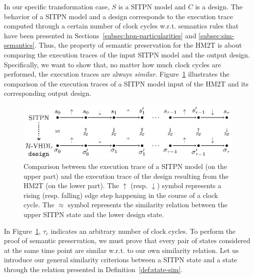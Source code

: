 \documentclass[pdflatex,sn-mathphys]{sn-jnl}%
\theoremstyle{thmstyleone}%
\theoremstyle{thmstyletwo}%
\theoremstyle{thmstylethree}%
\begin{document}
In our specific transformation case, $S$ is a SITPN model and $C$ is a
\hvhdl{} design. The behavior of a SITPN model and a \hvhdl{} design
corresponds to the execution trace computed through a certain number
of clock cycles w.r.t. semantics rules that have been presented in
Sections~\ref{subsec:hpn-particularities} and
\ref{subsec:sim-semantics}. Thus, the property of semantic
preservation for the HM2T is about comparing the execution traces of
the input SITPN model and the output \hvhdl{} design. Specifically, we
want to show that, no matter how much clock cycles are performed, the
execution traces are always
\textit{similar}. Figure~\ref{fig:trace-comparison} illustrates the
comparison of the execution traces of a SITPN model input of the HM2T
and its corresponding output design.
\begin{figure}[!ht]
  \centering
  \includegraphics[keepaspectratio,width=\textwidth]{trace-comparison-full.eps}
  \caption{Comparison between the execution trace of a SITPN model (on
    the upper part) and the execution trace of the \hvhdl{} design
    resulting from the HM2T (on the lower part). The $\uparrow$
    (resp. $\downarrow$) symbol represents a rising (resp. falling)
    edge step happening in the course of a clock cycle. The $\approx$
    symbol represents the similarity relation between the upper SITPN
    state and the lower \hvhdl{} design state.}
  \label{fig:trace-comparison}
\end{figure}

In Figure~\ref{fig:trace-comparison}, $\tau_c$ indicates an arbitrary
number of clock cycles. To perform the proof of semantic preservation,
we must prove that every pair of states considered at the same time
point are similar w.r.t. to our own similarity relation.  Let us
introduce our general similarity criterions between a SITPN state and
a \hvhdl{} state through the relation presented in
Definition~\ref{def:state-sim}.
\end{document}
